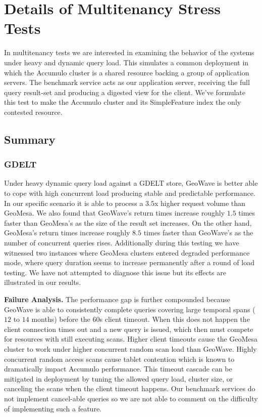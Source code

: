 \section{Details of Multitenancy Stress Tests}
\label{appendix:multitenancy}

In multitenancy tests we are interested in examining the behavior of the systems under heavy and dynamic query load.
This simulates a common deployment in which the Accumulo cluster is a shared resource backing a group of application servers.
The benchmark service acts as our application server, receiving the full query result-set and producing a digested view for the client.
We’ve formulate this test to make the Accumulo cluster and its SimpleFeature index the only contested resource.

\subsection{Summary}

\subsubsection{GDELT}

Under heavy dynamic query load against a GDELT store, GeoWave is better able to cope with high concurrent load producing stable and predictable performance.
In our specific scenario it is able to process a $3.5$x higher request volume than GeoMesa.
We also found that GeoWave's return times increase roughly $1.5$ times faster than GeoMesa's as the size of the result set increases.
On the other hand, GeoMesa's return times increase roughly $8.5$ times faster than GeoWave's as the number of concurrent queries rises.
Additionally during this testing we have witnessed two instances where GeoMesa clusters entered degraded performance mode, where query duration seems to
increase permanently after a round of load testing.
We have not attempted to diagnose this issue but its effects are illustrated in our results.

{\bf Failure Analysis.}
The performance gap is further compounded because GeoWave is able to consistently complete queries covering large temporal spans ($12$ to $14$ months) before the $60$s client timeout.
When this does not happen the client connection times out and a new query is issued, which then must compete for resources with still executing scans.
Higher client timeouts cause the GeoMesa cluster to work under higher concurrent random scan load than GeoWave.
Highly concurrent random access scans cause tablet contention which is known to dramatically impact Accumulo performance.
This timeout cascade can be mitigated in deployment by tuning the allowed query load, cluster size, or canceling the scans when the client timeout happens.
Our benchmark services do not implement cancel-able queries so we are not able to comment on the difficulty of implementing such a feature.

